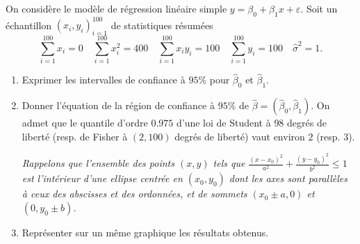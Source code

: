 \documentclass{td_um}
\providecommand{\1}{\mathds{1}}
\begin{document}
	\cor{\newpage}
	
	
	On considère le modèle de régression linéaire simple $y=\beta_{0}+\beta_{1} x+\varepsilon$. Soit un échantillon $(x_{i}, y_{i})_{i=1}^{100}$ de statistiques résumées
	$$
	\sum_{i=1}^{100} x_{i}=0 \quad \sum_{i=1}^{100} x_{i}^{2}=400 \quad \sum_{i=1}^{100} x_{i} y_{i}=100 \quad \sum_{i=1}^{100} y_{i}=100 \quad \hat{\sigma}^{2}=1 .
	$$
	\begin{enumerate}
		\item  Exprimer les intervalles de confiance à $95 \%$ pour $\hat\beta_{0}$ et $\hat\beta_{1}$.
		\item  Donner l'équation de la région de confiance à $95 \%$ de $\hat\beta = \left(\hat\beta_{0}, \hat\beta_{1}\right)$. On admet que le quantile d'ordre $0.975$ d'une loi de Student à $98$ degrés de liberté (resp. de Fisher à $(2,100)$ degrés de liberté) vaut environ $2$ (resp. $3$).
		
		\textit{Rappelons que l'ensemble des points $(x, y)$ tels que $\frac{\left(x-x_{0}\right)^{2}}{a^{2}}+\frac{\left(y-y_{0}\right)^{2}}{b^{2}} \leq 1$ est l'intérieur d'une ellipse centrée en $(x_{0}, y_{0})$ dont les axes sont parallèles à ceux des abscisses et des ordonnées, et de sommets $(x_{0} \pm a, 0)$ et  $(0, y_{0} \pm b)$.}
		\item  Représenter sur un même graphique les résultats obtenus.
	\end{enumerate}
	
\end{document}
